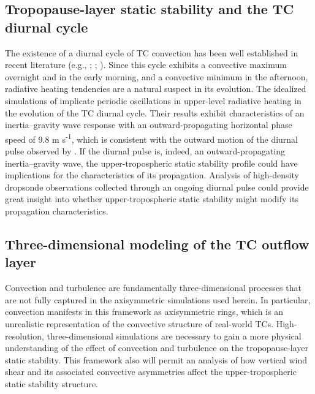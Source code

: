 \subsection{Tropopause-layer static stability and the TC diurnal cycle}

The existence of a diurnal cycle of TC convection has been well established in recent literature (e.g., \citeauthor{Kossin2002} \citeyear{Kossin2002}; \citeauthor{Dunionetal2014} \citeyear{Dunionetal2014}; \citeauthor{BowmanFowler2015} \citeyear{BowmanFowler2015}).
Since this cycle exhibits a convective maximum overnight and in the early morning, and a convective minimum in the afternoon, radiative heating tendencies are a natural suspect in its evolution.
The idealized simulations of \cite{NavarroHakim2016} implicate periodic oscillations in upper-level radiative heating in the evolution of the TC diurnal cycle.
Their results exhibit characteristics of an inertia--gravity wave response with an outward-propagating horizontal phase speed of 9.8 m s\textsuperscript{-1}, which is consistent with the outward motion of the diurnal pulse observed by \cite{Dunionetal2014}. If the diurnal pulse is, indeed, an outward-propagating inertia--gravity wave, the upper-tropospheric static stability profile could have implications for the characteristics of its propagation.
Analysis of high-density dropsonde observations collected through an ongoing diurnal pulse could provide great insight into whether upper-tropospheric static stability might modify its propagation characteristics.

\subsection{Three-dimensional modeling of the TC outflow layer}
Convection and turbulence are fundamentally three-dimensional processes that are not fully captured in the axisymmetric simulations used herein.
In particular, convection manifests in this framework as axisymmetric rings, which is an unrealistic representation of the convective structure of real-world TCs.
High-resolution, three-dimensional simulations are necessary to gain a more physical understanding of the effect of convection and turbulence on the tropopause-layer static stability.
This framework also will permit an analysis of how vertical wind shear and its associated convective asymmetries affect the upper-tropospheric static stability structure.


